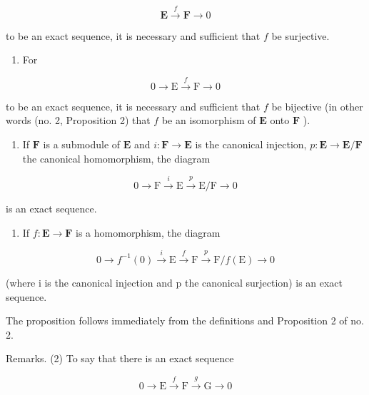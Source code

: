\[
\mathbf {E} \xrightarrow {f} \mathbf {F} \longrightarrow 0
\]

to be an exact sequence, it is necessary and sufficient that \(f\) be surjective.

\begin{enumerate}
\def\labelenumi{(\alph{enumi})}
\setcounter{enumi}{2}
\tightlist
\item
  For
\end{enumerate}

\[
0 \longrightarrow \mathrm{E} \stackrel {f} {\longrightarrow} \mathrm{F} \longrightarrow 0
\]

to be an exact sequence, it is necessary and sufficient that \(f\) be bijective (in other words (no. 2, Proposition 2) that \(f\) be an isomorphism of \(\mathbf{E}\) onto \(\mathbf{F}\) ).

\begin{enumerate}
\def\labelenumi{(\alph{enumi})}
\setcounter{enumi}{3}
\tightlist
\item
  If \(\mathbf{F}\) is a submodule of \(\mathbf{E}\) and \(i: \mathbf{F} \to \mathbf{E}\) is the canonical injection, \(p: \mathbf{E} \to \mathbf{E} / \mathbf{F}\) the canonical homomorphism, the diagram
\end{enumerate}

\[
0 \longrightarrow \mathrm{F} \stackrel {i} {\longrightarrow} \mathrm{E} \stackrel {p} {\longrightarrow} \mathrm{E} / \mathrm{F} \longrightarrow 0\tag{14}
\]

is an exact sequence.

\begin{enumerate}
\def\labelenumi{(\alph{enumi})}
\setcounter{enumi}{4}
\tightlist
\item
  If \(f: \mathbf{E} \to \mathbf{F}\) is a homomorphism, the diagram
\end{enumerate}

\[
0 \longrightarrow f ^ {- 1} (0) \stackrel {i} {\longrightarrow} \mathrm{E} \stackrel {f} {\longrightarrow} \mathrm{F} \stackrel {p} {\longrightarrow} \mathrm{F} / f (\mathrm{E}) \rightarrow 0
\]

(where i is the canonical injection and p the canonical surjection) is an exact sequence.

The proposition follows immediately from the definitions and Proposition 2 of no. 2.

Remarks. (2) To say that there is an exact sequence

\[
0 \longrightarrow \mathrm{E} \stackrel {f} {\longrightarrow} \mathrm{F} \stackrel {g} {\longrightarrow} \mathrm{G} \longrightarrow 0
\]

